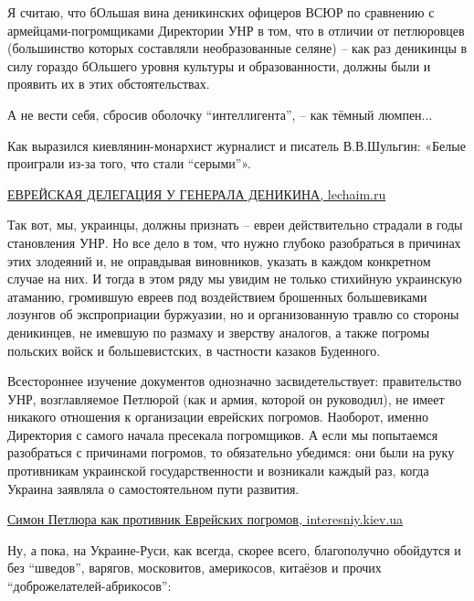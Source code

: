 \begin{itemize}

Я считаю, что бОльшая вина деникинских офицеров ВСЮР по сравнению с
армейцами-погромщиками Директории УНР в том, что в отличии от петлюровцев
(большинство которых составляли необразованные селяне) – как раз деникинцы в
силу гораздо бОльшего уровня культуры и образованности, должны были и проявить
их в этих обстоятельствах.

А не вести себя, сбросив оболочку \enquote{интеллигента}, – как тёмный
люмпен...

Как выразился киевлянин-монархист журналист и писатель В.В.Шульгин: «Белые
проиграли из-за того, что стали \enquote{серыми}».

\href{https://lechaim.ru/ARHIV/164/dostup.htm}{%
ЕВРЕЙСКАЯ ДЕЛЕГАЦИЯ У ГЕНЕРАЛА ДЕНИКИНА, lechaim.ru%
}


Так вот, мы, украинцы, должны признать – евреи действительно страдали в годы
становления УНР. Но все дело в том, что нужно глубоко разобраться в причинах
этих злодеяний и, не оправдывая виновников, указать в каждом конкретном случае
на них. И тогда в этом ряду мы увидим не только стихийную украинскую атаманию,
громившую евреев под воздействием брошенных большевиками лозунгов об
экспроприации буржуазии, но и организованную травлю со стороны деникинцев, не
имевшую по размаху и зверству аналогов, а также погромы польских войск и
большевистских, в частности казаков Буденного.

Всестороннее изучение документов однозначно засвидетельствует: правительство
УНР, возглавляемое Петлюрой (как и армия, которой он руководил), не имеет
никакого отношения к организации еврейских погромов. Наоборот, именно
Директория с самого начала пресекала погромщиков. А если мы попытаемся
разобраться с причинами погромов, то обязательно убедимся: они были на руку
противникам украинской государственности и возникали каждый раз, когда Украина
заявляла о самостоятельном пути развития.

\href{https://www.interesniy.kiev.ua/simon-petlyura-kak-protivnik-evreyski}{%
Симон Петлюра как противник Еврейских погромов, interesniy.kiev.ua%
}


Ну, а пока, на Украине-Руси, как всегда, скорее всего, благополучно обойдутся и
без \enquote{шведов}, варягов, московитов, америкосов, китаёзов и прочих
\enquote{доброжелателей-абрикосов}:


\end{itemize}
